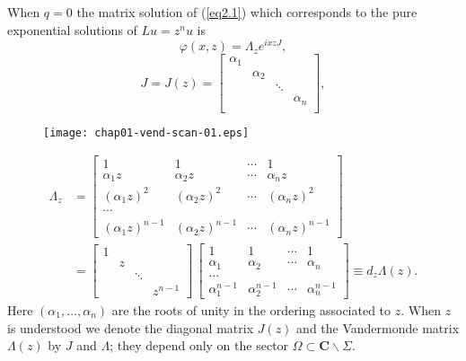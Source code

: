 \documentclass{surv-l}
\theoremstyle{plain}
\theoremstyle{definition}
\numberwithin{equation}{chapter}
\begin{document}
When $q=0$ the matrix solution of (\ref{eq2.1}) which corresponds to the pure exponential solutions of $Lu=z^{n}u$ is
\begin{equation*}
\varphi(x, z)=\Lambda_{z}e^{ixzJ},
\end{equation*}
\begin{equation}\label{eq2.8}
J=J(z)=\left[
         \begin{array}{cccc}
           \alpha_{1}&  &  &  \\
            & \alpha_{2} &  &  \\
            &  & \ddots &  \\
            &  &  & \alpha_{n} \\
         \end{array}
       \right],
\end{equation}
\begin{figure}
\texttt{[image: chap01-vend-scan-01.eps]}
\caption{}
\label{fig1}
\end{figure}

\begin{align}\label{eq2.9}
\Lambda_{z}&=\left[\begin{array}{cccc}
1 & 1 & \cdots & 1\\
\alpha_{1}z & \alpha_{2}z & \cdots & \alpha_{n}z\\
(\alpha_{1}z)^{2} & (\alpha_{2}z)^{2} & \cdots & (\alpha_{n}z)^{2}\\
\cdots& & &\\
(\alpha_{1}z)^{n-1} & (\alpha_{2}z)^{n-1} & \cdots & (\alpha_{n}z)^{n-1 }
\end{array}\right]\\\nonumber
&=\left[\begin{array}{cccc}
1 & & & \\
& z & & \\
& & \ddots&\\
& & &z^{n-1}
\end{array}\right]\,\left[\begin{array}{cccc}
1 & 1 & \cdots & 1\\
\alpha_{1} & \alpha_{2} & \cdots & \alpha_{n}\\
\ldots& & &\\
\alpha_{1}^{n-1} & \alpha_{2}^{n-1} & \cdots & \alpha_{n}^{n-1}
\end{array}\right]\equiv d_{z}\Lambda(z).
\end{align}
Here $(\alpha_{1},\ldots, \alpha_{n})$ are the roots of unity in the ordering associated to $z$. When $z$ is understood we denote the diagonal matrix $J(z)$ and the Vandermonde matrix $\Lambda(z)$ by $J$ and $\Lambda$; they depend only on the sector $\Omega \subset \mathbf{C}\backslash \Sigma$.
\end{document}
